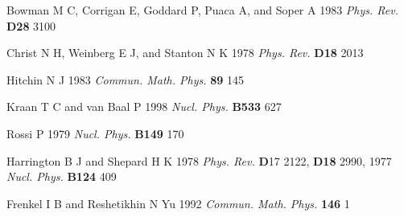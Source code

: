 \documentclass[a4paper,10pt]{article}
\begin{document}
\begin{thebibliography}{99}
 Bowman M C, Corrigan E, Goddard P, Puaca A, and Soper A 1983 {\it Phys. Rev.} \textbf{D28} 3100

 Christ N H, Weinberg E J, and Stanton N K 1978 {\it Phys. Rev.} \textbf{D18} 2013

 Hitchin N J 1983 {\it Commun. Math. Phys.} \textbf{89} 145

 Kraan T C and van Baal P 1998 {\it Nucl. Phys.} \textbf{B533} 627

 Rossi P 1979 {\it Nucl. Phys.} \textbf{B149} 170

 Harrington B J and Shepard H K 1978 {\it Phys. Rev.} {\textbf D17} 2122, \textbf{D18} 2990, 1977 {\it Nucl. Phys.} \textbf{B124} 409

 Frenkel I B and Reshetikhin N Yu 1992 {\it Commun. Math. Phys.} \textbf{146} 1

\end{thebibliography}
\end{document}
